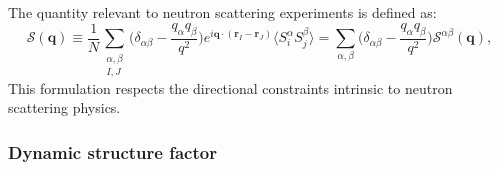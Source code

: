 The quantity relevant to neutron scattering experiments is defined as:
\begin{equation}
    \mathcal{S} (\mathbf{q}) 
    \equiv 
    \frac{1}{N} 
    \sum_{\substack{\alpha, \beta \\ I, J}}
    \Big(
    \delta_{\alpha\beta} - \frac{q_{\alpha} q_{\beta}}{q^{2}} 
    \Big)
    e^{i \mathbf{q} \cdot ( \mathbf{r}_{I} - \mathbf{r}_{J} ) }
    \langle 
    S_{i}^{\alpha}
    S_{j}^{\beta} 
    \rangle
    = 
    \sum_{\alpha, \beta} 
    \Big( \delta_{\alpha\beta} - \frac{q_{\alpha} q_{\beta}}{q^{2}} \Big)
    \mathcal{S}^{\alpha\beta} (\mathbf{q}) ,
\end{equation}
This formulation respects the directional constraints intrinsic to neutron scattering physics.



\subsubsection{Dynamic structure factor} 

